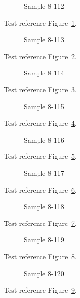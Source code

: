 \begin{figure}[tbhp]
\caption{Sample 8-112}
\label{fig:sample-8-112}
\end{figure}

Test reference Figure~\ref{fig:sample-8-112}.

\begin{figure}[tbhp]
\caption{Sample 8-113}
\label{fig:sample-8-113}
\end{figure}

Test reference Figure~\ref{fig:sample-8-113}.

\begin{figure}[tbhp]
\caption{Sample 8-114}
\label{fig:sample-8-114}
\end{figure}

Test reference Figure~\ref{fig:sample-8-114}.

\begin{figure}[tbhp]
\caption{Sample 8-115}
\label{fig:sample-8-115}
\end{figure}

Test reference Figure~\ref{fig:sample-8-115}.

\begin{figure}[tbhp]
\caption{Sample 8-116}
\label{fig:sample-8-116}
\end{figure}

Test reference Figure~\ref{fig:sample-8-116}.

\begin{figure}[tbhp]
\caption{Sample 8-117}
\label{fig:sample-8-117}
\end{figure}

Test reference Figure~\ref{fig:sample-8-117}.

\begin{figure}[tbhp]
\caption{Sample 8-118}
\label{fig:sample-8-118}
\end{figure}

Test reference Figure~\ref{fig:sample-8-118}.

\begin{figure}[tbhp]
\caption{Sample 8-119}
\label{fig:sample-8-119}
\end{figure}

Test reference Figure~\ref{fig:sample-8-119}.

\begin{figure}[tbhp]
\caption{Sample 8-120}
\label{fig:sample-8-120}
\end{figure}

Test reference Figure~\ref{fig:sample-8-120}.

